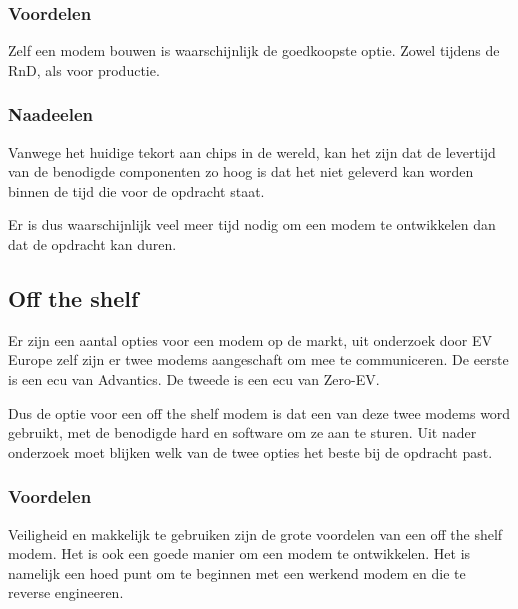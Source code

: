\subsubsection{Voordelen}

Zelf een modem bouwen is waarschijnlijk de goedkoopste optie. Zowel tijdens de
RnD, als voor productie.

\subsubsection{Naadeelen}

Vanwege het huidige tekort aan chips in de wereld, kan het zijn dat de
levertijd van de benodigde componenten zo hoog is dat het niet geleverd
kan worden binnen de tijd die voor de opdracht staat. 

Er is dus waarschijnlijk veel meer tijd nodig om een modem te ontwikkelen dan
dat de opdracht kan duren.

\subsection{Off the shelf}

Er zijn een aantal opties voor een modem op de markt, uit onderzoek door EV
Europe zelf zijn er twee modems aangeschaft om mee te communiceren. De eerste
is een \ac{ecu} van Advantics. De tweede is een \ac{ecu} van Zero-EV.

Dus de optie voor een off the shelf modem is dat een van deze twee modems word
gebruikt, met de benodigde hard en software om ze aan te sturen. Uit nader
onderzoek moet blijken welk van de twee opties het beste bij de opdracht past.

\subsubsection{Voordelen}

Veiligheid en makkelijk te gebruiken zijn de grote voordelen van een off the
shelf modem. Het is ook een goede manier om een modem te ontwikkelen. Het is
namelijk een hoed punt om te beginnen met een werkend modem en die te reverse
engineeren.

